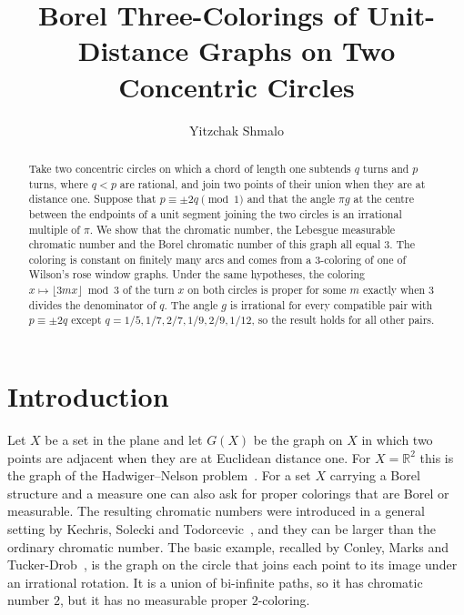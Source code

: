 \documentclass[11pt]{amsart}
\theoremstyle{remark}
\numberwithin{equation}{section}
\begin{document}
\title[Three-colorings on two concentric circles]{Borel Three-Colorings of Unit-Distance Graphs on Two Concentric Circles}
\author{Yitzchak Shmalo}
\address{Einstein Institute of Mathematics, The Hebrew University of Jerusalem, Jerusalem, Israel}
\date{}

\begin{abstract}
Take two concentric circles on which a chord of length one subtends $q$
turns and $p$ turns, where $q<p$ are rational, and join two points of their union when
they are at distance one. Suppose that $p\equiv\pm2q\pmod 1$ and that
the angle $\pi g$ at the centre between the endpoints of a unit segment
joining the two circles is an irrational multiple of $\pi$. We show that
the chromatic number, the Lebesgue measurable chromatic number and the
Borel chromatic number of this graph all equal $3$. The coloring is
constant on finitely many arcs and comes from a $3$-coloring
of one of Wilson's rose window graphs. Under the same hypotheses, the
coloring $x\mapsto\lfloor3mx\rfloor\bmod3$ of the turn $x$ on both
circles is proper for some $m$ exactly when $3$ divides the denominator
of $q$. The angle $g$ is irrational for every compatible pair with
$p\equiv\pm2q$ except
$q=1/5,1/7,2/7,1/9,2/9,1/12$, so the result holds for all other
pairs.
\end{abstract}

\maketitle

\section{Introduction}

Let $X$ be a set in the plane and let $G(X)$ be the graph on $X$ in
which two points are adjacent when they are at Euclidean distance one.
For $X=\mathbb R^2$ this is the graph of the Hadwiger--Nelson
problem~\cite{Soi09}. For a set $X$ carrying a Borel structure and a
measure one can also ask for proper colorings that are Borel or
measurable. The resulting chromatic numbers were introduced in a general
setting by Kechris, Solecki and Todorcevic~\cite{KST99}, and they can be
larger than the ordinary chromatic number. The basic example, recalled
by Conley, Marks and Tucker-Drob~\cite{CMT16}, is the graph on the
circle that joins each point to its image under an irrational rotation.
It is a union of bi-infinite paths, so it has chromatic number $2$, but
it has no measurable proper $2$-coloring.
\end{document}
